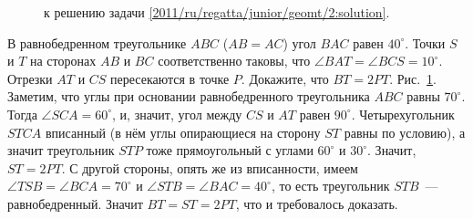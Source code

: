 \ifsolution
\begin{figure}\centering
    \caption{к решению задачи \ref{2011/ru/regatta/junior/geomt/2:solution}.}
    \label{2011/ru/regatta/junior/geomt/2:solution:fig}
\end{figure}%
\fi %

\problem
В равнобедренном треугольнике $ABC$ ($AB = AC$) угол $BAC$ равен $40^\circ$.
Точки $S$ и $T$ на сторонах $AB$ и $BC$ соответственно таковы, что
$\angle BAT = \angle BCS = 10^\circ$.
Отрезки $AT$ и $CS$ пересекаются в точке $P$.
Докажите, что $BT = 2 PT$.
\solution
\label{2011/ru/regatta/junior/geomt/2:solution}%
Рис.~\ref{2011/ru/regatta/junior/geomt/2:solution:fig}.
Заметим, что углы при основании равнобедренного треугольника $ABC$ равны
$70^\circ$.
Тогда $\angle SCA = 60^\circ$, и, значит, угол между $CS$ и $AT$ равен
$90^\circ$.
Четырехугольник $STCA$ вписанный
(в нём углы опирающиеся на сторону $ST$ равны по условию),
а значит треугольник $STP$ тоже прямоугольный с углами $60^\circ$ и $30^\circ$.
Значит, $ST = 2 PT$.
С другой стороны, опять же из вписанности, имеем
$\angle TSB = \angle BCA = 70^\circ$ и
$\angle STB = \angle BAC = 40^\circ$,
то есть треугольник $STB$~--- равнобедренный.
Значит $BT = ST = 2 PT$, что и требовалось доказать.
\endproblem
